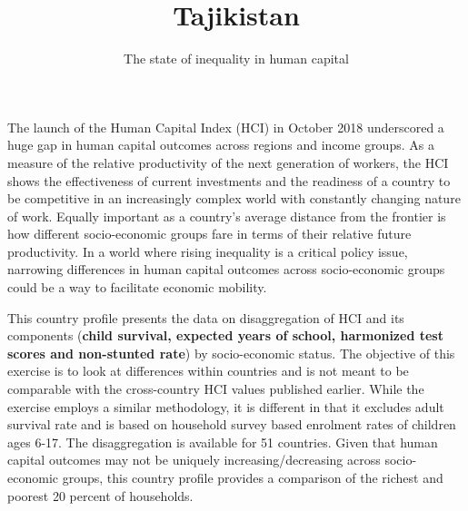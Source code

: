 \documentclass[8pt,]{article}
\title{Tajikistan}
\author{The state of inequality in human capital}
\date{}
\begin{document}
\maketitle

\newcommand\boldblue[1]{\textcolor{bondiblue}{\textbf{#1}}}

The launch of the Human Capital Index (HCI) in October 2018 underscored
a huge gap in human capital outcomes across regions and income groups.
As a measure of the relative productivity of the next generation of
workers, the HCI shows the effectiveness of current investments and the
readiness of a country to be competitive in an increasingly complex
world with constantly changing nature of work. Equally important as a
country's average distance from the frontier is how different
socio-economic groups fare in terms of their relative future
productivity. In a world where rising inequality is a critical policy
issue, narrowing differences in human capital outcomes across
socio-economic groups could be a way to facilitate economic mobility.

This country profile presents the data on disaggregation of HCI and its
components (\textbf{child survival, expected years of school, harmonized
test scores and non-stunted rate}) by socio-economic status. The
objective of this exercise is to look at differences within countries
and is not meant to be comparable with the cross-country HCI values
published earlier. While the exercise employs a similar methodology, it
is different in that it excludes adult survival rate and is based on
household survey based enrolment rates of children ages 6-17. The
disaggregation is available for 51 countries. Given that human capital
outcomes may not be uniquely increasing/decreasing across socio-economic
groups, this country profile provides a comparison of the richest and
poorest 20 percent of households.
\end{document}
